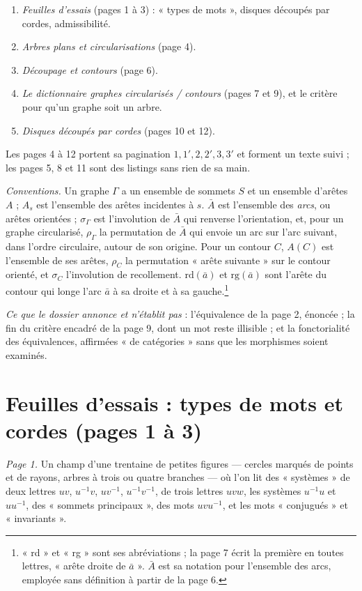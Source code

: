 \documentclass[11pt,a4paper]{article}
\begin{document}
\begin{enumerate}
\item[1.] \emph{Feuilles d'essais} (pages 1 à 3) : « types de mots », disques
découpés par cordes, admissibilité.
\item[2.] \emph{Arbres plans et circularisations} (page 4).
\item[3.] \emph{Découpage et contours} (page 6).
\item[4.] \emph{Le dictionnaire graphes circularisés / contours} (pages 7 et 9),
et le critère pour qu'un graphe soit un arbre.
\item[5.] \emph{Disques découpés par cordes} (pages 10 et 12).
\end{enumerate}

Les pages 4 à 12 portent sa pagination $1, 1', 2, 2', 3, 3'$ et forment un
texte suivi ; les pages 5, 8 et 11 sont des listings sans rien de sa main.

\emph{Conventions.} Un graphe $\Gamma$ a un ensemble de sommets $S$ et un
ensemble d'arêtes $A$ ; $A_{s}$ est l'ensemble des arêtes incidentes à $s$.
$\bar{A}$ est l'ensemble des \emph{arcs}, ou arêtes orientées ;
$\sigma_{\Gamma}$ est l'involution de $\bar{A}$ qui renverse l'orientation, et,
pour un graphe circularisé, $\rho_{\Gamma}$ la permutation de $\bar{A}$ qui envoie
un arc sur l'arc suivant, dans l'ordre circulaire, autour de son origine. Pour
un contour $C$, $A(C)$ est l'ensemble de ses arêtes, $\rho_{C}$ la permutation
« arête suivante » sur le contour orienté, et $\sigma_{C}$ l'involution de
recollement. $\mathrm{rd}(\bar{a})$ et $\mathrm{rg}(\bar{a})$ sont l'arête du
contour qui longe l'arc $\bar{a}$ à sa droite et à sa gauche.\footnote{« rd »
et « rg » sont ses abréviations ; la page 7 écrit la première en toutes lettres,
« arête droite de $\bar{a}$ ». $\bar{A}$ est sa notation pour l'ensemble des
arcs, employée sans définition à partir de la page 6.}

\emph{Ce que le dossier annonce et n'établit pas} : l'équivalence de la page 2,
énoncée ; la fin du critère encadré de la page 9, dont un mot reste illisible ; et la
fonctorialité des équivalences, affirmées « de catégories » sans que les
morphismes soient examinés.

\section*{Feuilles d'essais : types de mots et cordes (pages 1 à 3)}

\emph{Page 1.} Un champ d'une trentaine de petites figures --- cercles marqués
de points et de rayons, arbres à trois ou quatre branches --- où l'on lit des
« systèmes » de deux lettres $uv$, $u^{-1}v$, $uv^{-1}$, $u^{-1}v^{-1}$, de
trois lettres $uvw$, les systèmes $u^{-1}u$ et $uu^{-1}$, des « sommets
principaux », des mots $uvu^{-1}$, et les mots « conjugués » et
« invariants ».
\end{document}
